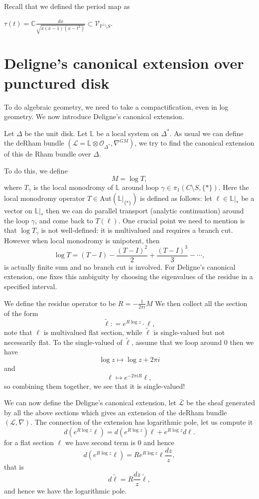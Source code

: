 \documentclass[11pt]{article}
\theoremstyle{definition}
\newcommand\PP{{\mathbb{P}}}
\begin{document}
Recall that we defined the period map as 

$\tau(t) = \mathbb{C} \frac{dx}{\sqrt{x(x-1)(x-t^2)}} \subset \mathcal{V}_{\PP^1 \setminus S}$. 

\section{Deligne's canonical extension over punctured disk}
To do algebraic geometry, we need to take a compactification, even in log geometry. We now introduce Deligne's canonical extension. 


Let $\Delta$ be the unit disk. Let $\mathbb{L}$ be a local system on $\Delta^*$. As usual we can define the deRham bundle $(\mathcal{L} = \mathbb{L}\otimes \mathcal{O}_{\Delta^*}, \nabla^{GM})$, we try to find the canonical extension of this de Rham bundle over $\Delta$. 


To do this, we define $$M = \log T,$$
where $T_{\gamma}$ is the local monodromy of $\mathbb{L}$ around loop $\gamma \in \pi_1(C\setminus S ,\{*\})$. Here the local monodromy operator $T\in \text{Aut}(\mathbb{L}|_{\{*\}})$ is defined as follows: let $\ell \in \mathbb{L}|_{*}$ be a vector on $\mathbb{L}|_{*}$ then we can do parallel transport (analytic continuation) around the loop $\gamma$, and come back to $T (\ell)$. One crucial point we need to mention is that $\log T_{\gamma}$ is not well-defined: it is multivalued and requires a branch cut. However when local monodromy is unipotent, then $$\log T=(T-I)-\frac{(T-I)^2}{2}+\frac{(T-I)^3}{3}-\cdots,$$
is actually finite sum and no branch cut is involved. For Deligne’s canonical extension, one fixes this ambiguity by choosing the eigenvalues of the residue in a specified interval. 

We define the residue operator to be $R = -\frac{1}{2\pi i} M$ We then collect all the section of the form $$\tilde{\ell} : =  e^{R\log z}\cdot \ell,$$
note that $\ell$ is multivalued flat section, while $\tilde{\ell}$ is single-valued but not necessarily flat. To the single-valued of $\tilde{\ell}$, assume that we loop around $0$ then we have $$\log z \mapsto \log z+2 \pi i$$and $$\ell \mapsto e^{-2 \pi i R} \ell,$$so combining them together, we see that it is single-valued!

We can now define the Deligne's canonical extension, let $\bar{\mathcal{L}}$ be the sheaf generated by  all the above sections which gives an extension of the deRham bundle $(\mathcal{L},\nabla)$. The connection of the extension has logarithmic pole, let us compute it $$d\left(e^{R \log z} \ell\right)=d\left(e^{R \log z}\right) \ell+e^{R \log z} d \ell .$$
for a flat section $\ell$ we have second term is 0 and hence $$d\left(e^{R \log z} \ell\right)=R e^{R \log z} \ell \frac{d z}{z},$$that is $$d \tilde{\ell}=R \frac{d z}{z} \tilde{\ell},$$and hence we have the logarithmic pole. 
\end{document}
